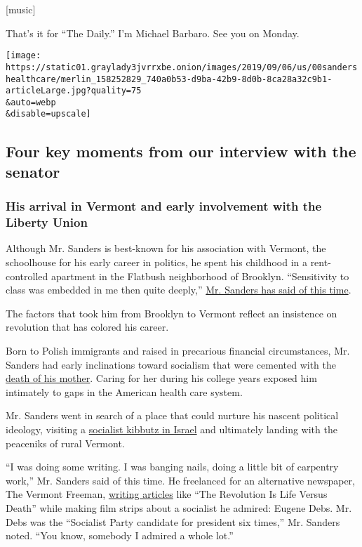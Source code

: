 {[}music{]}

That's it for ``The Daily.'' I'm Michael Barbaro. See you on Monday.

\texttt{[image: https://static01.graylady3jvrrxbe.onion/images/2019/09/06/us/00sandershealthcare/merlin\_158252829\_740a0b53-d9ba-42b9-8d0b-8ca28a32c9b1-articleLarge.jpg?quality=75\\\&auto=webp\\\&disable=upscale]}

\hypertarget{four-key-moments-from-our-interview-with-the-senator}{%
\subsection{Four key moments from our interview with the
senator}\label{four-key-moments-from-our-interview-with-the-senator}}

\hypertarget{his-arrival-in-vermont-and-early-involvement-with-the-liberty-union}{%
\subsubsection{His arrival in Vermont and early involvement with the
Liberty
Union}\label{his-arrival-in-vermont-and-early-involvement-with-the-liberty-union}}

Although Mr. Sanders is best-known for his association with Vermont, the
schoolhouse for his early career in politics, he spent his childhood in
a rent-controlled apartment in the Flatbush neighborhood of Brooklyn.
``Sensitivity to class was embedded in me then quite deeply,''
\href{https://www.nytimes3xbfgragh.onion/2007/01/21/magazine/21Sanders.t.html}{Mr.
Sanders has said of this time}.

The factors that took him from Brooklyn to Vermont reflect an insistence
on revolution that has colored his career.

Born to Polish immigrants and raised in precarious financial
circumstances, Mr. Sanders had early inclinations toward socialism that
were cemented with the
\href{https://www.nytimes3xbfgragh.onion/2019/09/09/us/politics/bernie-sanders-health-care.html}{death
of his mother}. Caring for her during his college years exposed him
intimately to gaps in the American health care system.

Mr. Sanders went in search of a place that could nurture his nascent
political ideology, visiting a
\href{https://www.nytimes3xbfgragh.onion/2016/02/06/us/politics/bernie-sanders-kibbutz.html}{socialist
kibbutz in Israel} and ultimately landing with the peaceniks of rural
Vermont.

``I was doing some writing. I was banging nails, doing a little bit of
carpentry work,'' Mr. Sanders said of this time. He freelanced for an
alternative newspaper, The Vermont Freeman,
\href{https://nytimes3xbfgragh.onion/2015/07/04/us/politics/bernie-sanderss-revolutionary-roots-were-nurtured-in-60s-vermont.html}{writing
articles} like ``The Revolution Is Life Versus Death'' while making film
strips about a socialist he admired: Eugene Debs. Mr. Debs was the
``Socialist Party candidate for president six times,'' Mr. Sanders
noted. ``You know, somebody I admired a whole lot.''

